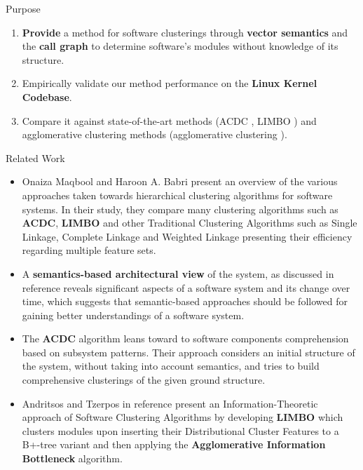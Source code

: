 \documentclass[final]{beamer}
\newlength{\colwidth}
\begin{document}
\begin{frame}[t]
\begin{columns}[t]
\begin{column}{\colwidth}
\begin{alertblock}{Purpose}
    
\begin{enumerate}
    \item \textbf{Provide} a method for software clusterings through \textbf{vector semantics} and the \textbf{call graph} to determine software's modules without knowledge of its structure.
    \item Empirically validate our method performance on the \textbf{Linux Kernel Codebase}.

    \item Compare it against state-of-the-art methods (ACDC \cite{acdc}, LIMBO \cite{LIMBO}) and agglomerative clustering methods (agglomerative clustering \cite{average, complete, ward}). 
\end{enumerate}
    
  \end{alertblock}

\begin{block}{Related Work} 

\begin{itemize}
\justifying

\item Onaiza Maqbool and Haroon A. Babri \cite{maqbool_overview} present an
overview of the various approaches taken towards hierarchical clustering algorithms
for software systems. In their study, they compare many clustering algorithms
such as \textbf{ACDC}, \textbf{LIMBO} and other Traditional Clustering Algorithms such as Single
Linkage, Complete Linkage and Weighted Linkage presenting their efficiency regarding 
multiple feature sets. 

\item A \textbf{semantics-based architectural view} of the system, as discussed in reference
\cite{large_study} reveals significant aspects of a software system and its change over 
time, which suggests that semantic-based approaches should be followed for gaining better understandings of a software system. 

\item The \textbf{ACDC} algorithm leans toward to software components comprehension 
based on subsystem patterns. Their approach considers an initial structure of the system, 
without taking into account semantics, and tries to build comprehensive clusterings of the given ground structure. 

\item Andritsos and Tzerpos in reference \cite{LIMBO} present an Information-Theoretic 
approach of Software Clustering Algorithms by developing \textbf{LIMBO} which clusters modules upon inserting their Distributional Cluster Features 
to a B+-tree variant and then applying the \textbf{Agglomerative Information Bottleneck} algorithm.
\end{itemize}


\end{block}
\end{column}
\end{columns}
\end{frame}
\end{document}
